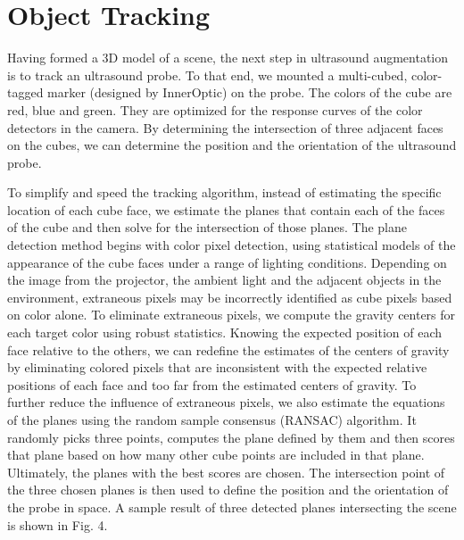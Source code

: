 \documentclass{llncs}
\begin{document}
\section{Object Tracking}

Having formed a 3D model of a scene, the next step in ultrasound augmentation is to track an ultrasound probe. To that end, we mounted a multi-cubed, color-tagged marker (designed by InnerOptic) on the probe.  The colors of the cube are red, blue and green. They are optimized for the response curves of the color detectors in the camera. By determining the intersection of three adjacent faces on the cubes, we can determine the position and the orientation of the ultrasound probe.

To simplify and speed the tracking algorithm, instead of estimating the specific location of each cube face, we estimate the planes that contain each of the faces of the cube and then solve for the intersection of those planes. The plane detection method begins with color pixel detection, using statistical models of the appearance of the cube faces under a range of lighting conditions. Depending on the image from the projector, the ambient light and the adjacent objects in the environment, extraneous pixels may be incorrectly identified as cube pixels based on color alone. To eliminate extraneous pixels, we compute the gravity centers for each target color using robust statistics. Knowing the expected position of each face relative to the others, we can redefine the estimates of the centers of gravity by eliminating colored pixels that are inconsistent with the expected relative positions of each face and too far from the estimated centers of gravity. To further reduce the influence of extraneous pixels, we also estimate the equations of the planes using the random sample consensus (RANSAC) algorithm. It randomly picks three points, computes the plane defined by them and then scores that plane based on how many other cube points are included in that plane. Ultimately, the planes with the best scores are chosen. The intersection point of the three chosen planes is then used to define the position and the orientation of the probe in space. A sample result of three detected planes intersecting the scene is shown in Fig. 4.
\end{document}
